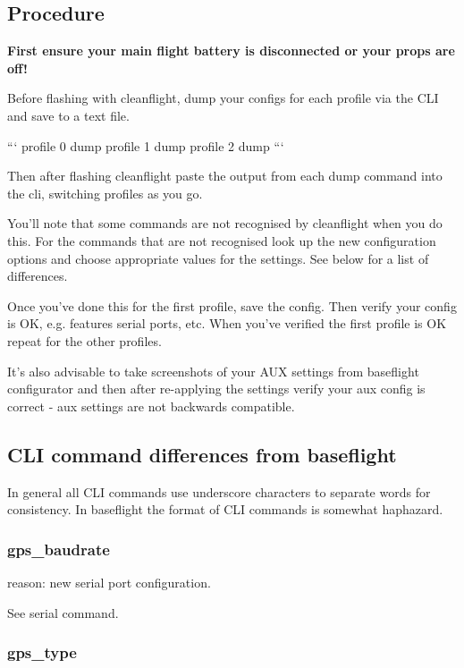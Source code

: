 \subsection*{Procedure}

{\bfseries First ensure your main flight battery is disconnected or your props are off!}

Before flashing with cleanflight, dump your configs for each profile via the C\+L\+I and save to a text file.

``` profile 0 dump profile 1 dump profile 2 dump ```

Then after flashing cleanflight paste the output from each dump command into the cli, switching profiles as you go.

You'll note that some commands are not recognised by cleanflight when you do this. For the commands that are not recognised look up the new configuration options and choose appropriate values for the settings. See below for a list of differences.

Once you've done this for the first profile, save the config. Then verify your config is O\+K, e.\+g. features serial ports, etc. When you've verified the first profile is O\+K repeat for the other profiles.

It's also advisable to take screenshots of your A\+U\+X settings from baseflight configurator and then after re-\/applying the settings verify your aux config is correct -\/ aux settings are not backwards compatible.

\subsection*{C\+L\+I command differences from baseflight}

In general all C\+L\+I commands use underscore characters to separate words for consistency. In baseflight the format of C\+L\+I commands is somewhat haphazard.

\subsubsection*{gps\+\_\+baudrate}

reason\+: new serial port configuration.

See {\ttfamily serial} command.

\subsubsection*{gps\+\_\+type}

